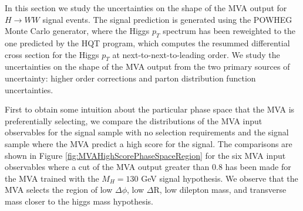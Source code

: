 
In this section we study the uncertainties on the shape of the MVA output for  
$H \to WW$ signal events. The signal prediction is generated using the POWHEG 
Monte Carlo generator, where the Higgs $p_{T}$ spectrum has been reweighted 
to the one predicted by the HQT program, which computes the resummed differential
cross section for the Higgs $p_{T}$ at next-to-next-to-leading order. We study
the uncertainties on the shape of the MVA output from the two primary 
sources of uncertainty: higher order corrections and parton distribution
function uncertainties.

First to obtain some intuition about the particular phase space that the
MVA is preferentially selecting, we compare the distributions of the 
MVA input observables for the signal sample with no selection requirements
and the signal sample where the MVA predict a high score for the signal.
The comparisons are shown in Figure \ref{fig:MVAHighScorePhaseSpaceRegion}
for the six MVA input observables where a cut of the MVA output greater 
than $0.8$ has been made for the MVA trained with the $M_{H} = 130$ GeV
signal hypothesis. We observe that the MVA selects the region of
low $\Delta\phi$, low $\Delta$R, low dilepton mass, and transverse 
mass closer to the higgs mass hypothesis. 


